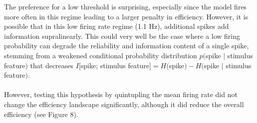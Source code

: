 \documentclass[12pt]{article}
\begin{document}
The preference for a low threshold is surprising, especially since the model fires more often in this regime leading to a larger penalty in efficiency.  However, it is possible that in this low firing rate regime (1.1 Hz), additional spikes add information supralinearly.  This could very well be the case where a low firing probability can degrade the reliability and information content of a single spike, stemming from a weakened conditional probability distribution $p($spike $|$ stimulus feature$)$ that decreases $I[$spike; stimulus feature$] = H($spike$) - H($spike $|$ stimulus feature$)$.  \\
\\
However, testing this hypothesis by quintupling the mean firing rate did not change the efficiency landscape significantly, although it did reduce the overall efficiency (see Figure 8). \\
\\
\end{document}
